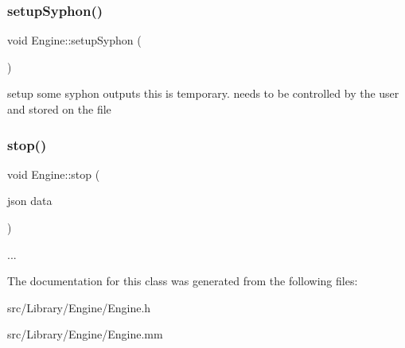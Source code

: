 \subsubsection{\texorpdfstring{setup\+Syphon()}{setupSyphon()}}
{\footnotesize\ttfamily void Engine\+::setup\+Syphon (\begin{DoxyParamCaption}{ }\end{DoxyParamCaption})}

setup some syphon outputs this is temporary. needs to be controlled by the user and stored on the file \mbox{\label{class_engine_a1c64956ca2429493e66c8aa0e5f3d23f}} 
\subsubsection{\texorpdfstring{stop()}{stop()}}
{\footnotesize\ttfamily void Engine\+::stop (\begin{DoxyParamCaption}\item[{json}]{data }\end{DoxyParamCaption})}

... 

The documentation for this class was generated from the following files\+:\begin{DoxyCompactItemize}
\item 
src/\+Library/\+Engine/Engine.\+h\item 
src/\+Library/\+Engine/Engine.\+mm\end{DoxyCompactItemize}
